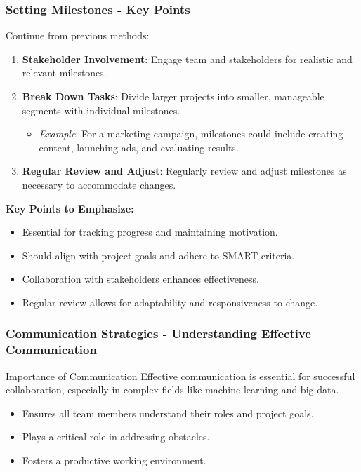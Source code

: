 \documentclass[aspectratio=169]{beamer}
\begin{document}
\begin{frame}[fragile]
    \frametitle{Setting Milestones - Key Points}
    Continue from previous methods:
    
    \begin{enumerate}[resume]
        \item \textbf{Stakeholder Involvement}: Engage team and stakeholders for realistic and relevant milestones.
        
        \item \textbf{Break Down Tasks}: Divide larger projects into smaller, manageable segments with individual milestones.
        \begin{itemize}
            \item \textit{Example}: For a marketing campaign, milestones could include creating content, launching ads, and evaluating results.
        \end{itemize}

        \item \textbf{Regular Review and Adjust}: Regularly review and adjust milestones as necessary to accommodate changes.
    \end{enumerate}

    \textbf{Key Points to Emphasize:}
    \begin{itemize}
        \item Essential for tracking progress and maintaining motivation.
        \item Should align with project goals and adhere to SMART criteria.
        \item Collaboration with stakeholders enhances effectiveness.
        \item Regular review allows for adaptability and responsiveness to change.
    \end{itemize}
\end{frame}

\begin{frame}[fragile]
    \frametitle{Communication Strategies - Understanding Effective Communication}
    \begin{block}{Importance of Communication}
        Effective communication is essential for successful collaboration, especially in complex fields like machine learning and big data. 
        \begin{itemize}
            \item Ensures all team members understand their roles and project goals.
            \item Plays a critical role in addressing obstacles.
            \item Fosters a productive working environment.
        \end{itemize}
    \end{block}
\end{frame}
\end{document}
